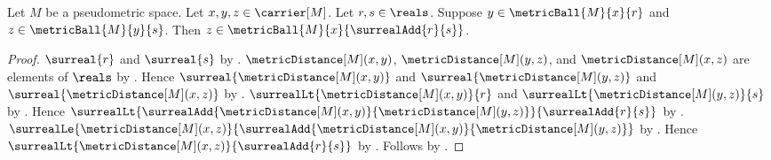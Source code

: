 \begin{theorem}\label{metric_ball_triangle}
    Let $M$ be a pseudometric space.
    Let $x,y,z\in\carrier[M]$.
    Let $r,s\in\reals$.
    Suppose $y\in\metricBall{M}{x}{r}$ and
        $z\in\metricBall{M}{y}{s}$.
    Then $z\in\metricBall{M}{x}{\surrealAdd{r}{s}}$.
\end{theorem}
\begin{proof}
    $\surreal{r}$ and $\surreal{s}$
        by .
    $\metricDistance[M](x,y)$,
        $\metricDistance[M](y,z)$, and
        $\metricDistance[M](x,z)$ are elements of $\reals$
        by .
    Hence $\surreal{\metricDistance[M](x,y)}$ and
        $\surreal{\metricDistance[M](y,z)}$ and
        $\surreal{\metricDistance[M](x,z)}$
        by .
    $\surrealLt{\metricDistance[M](x,y)}{r}$ and
        $\surrealLt{\metricDistance[M](y,z)}{s}$
        by .
    Hence
    $\surrealLt
        {\surrealAdd{\metricDistance[M](x,y)}
            {\metricDistance[M](y,z)}}
        {\surrealAdd{r}{s}}$
        by .
    $\surrealLe{\metricDistance[M](x,z)}
        {\surrealAdd{\metricDistance[M](x,y)}
            {\metricDistance[M](y,z)}}$
        by .
    Hence $\surrealLt{\metricDistance[M](x,z)}
        {\surrealAdd{r}{s}}$
        by .
    Follows by .
\end{proof}

